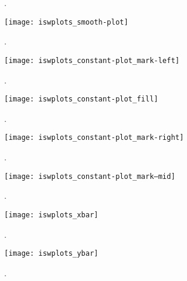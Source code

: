 \documentclass{scrartcl}
\begin{document}
\begin{figure}
  \centering
  \caption{%
    .%
  }
  \label{fig:iswplots_linear-plot}
\end{figure}

\begin{figure}
  \centering
  \texttt{[image: iswplots\_smooth-plot]}
  \caption{%
    .%
  }
  \label{fig:iswplots_smooth-plot}
\end{figure}

\begin{figure}
  \centering
  \texttt{[image: iswplots\_constant-plot\_mark-left]}
  \caption{%
    .%
  }
  \label{fig:constant-plot_mark-left}
\end{figure}

\begin{figure}
  \centering
  \texttt{[image: iswplots\_constant-plot\_fill]}
  \caption{%
    .%
  }
  \label{fig:iswplots_constant-plot_fill}
\end{figure}

\begin{figure}
  \centering
  \texttt{[image: iswplots\_constant-plot\_mark-right]}
  \caption{%
    .%
  }
  \label{fig:constant-plot_mark-right}
\end{figure}

\begin{figure}
  \centering
  \texttt{[image: iswplots\_constant-plot\_mark–mid]}
  \caption{%
    .%
  }
  \label{fig:constant-plot_mark-mid}
\end{figure}

\begin{figure}
  \centering
  \texttt{[image: iswplots\_xbar]}
  \caption{%
    .%
  }
  \label{fig:iswplots_xbar}
\end{figure}

\begin{figure}
  \centering
  \texttt{[image: iswplots\_ybar]}
  \caption{%
    .%
  }
  \label{fig:iswplots_ybar}
\end{figure}
\end{document}
